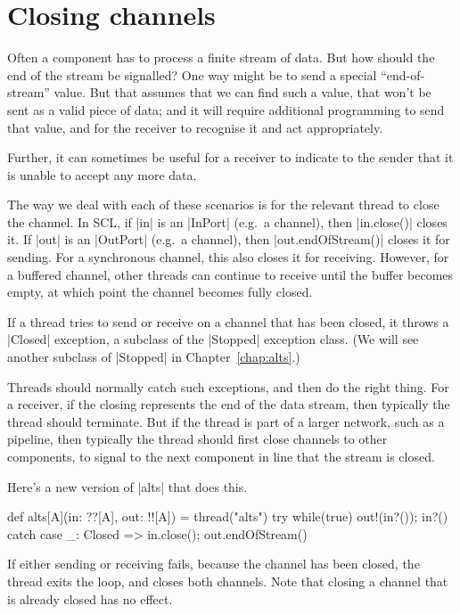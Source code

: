 \section{Closing channels}

Often a component has to process a finite stream of data.  But how should the
end of the stream be signalled?  One way might be to send a special
``end-of-stream'' value.  But that assumes that we can find such a value, that
won't be sent as a valid piece of data; and it will require additional
programming to send that value, and for the receiver to recognise it and act
appropriately. 

Further, it can sometimes be useful for a receiver to indicate to the sender
that it is unable to accept any more data.

The way we deal with each of these scenarios is for the relevant thread to
close the channel. 
%
In SCL, if |in| is an |InPort| (e.g.~a channel), then |in.close()| closes it.
%
If |out| is an |OutPort| (e.g.~a channel), then |out.endOfStream()| closes it
for sending.  For a synchronous channel, this also closes it for receiving.
However, for a buffered channel, other threads can continue to receive until
the buffer becomes empty, at which point the channel becomes fully closed.


If a thread tries to send or receive on a channel that has been closed, it
throws a |Closed| exception, a subclass of the |Stopped| exception class.
(We will see another subclass of |Stopped| in Chapter~\ref{chap:alts}.)

Threads should normally catch such exceptions, and then do the right thing.
For a receiver, if the closing represents the end of the data stream, then
typically the thread should terminate.  But if the thread is part of a larger
network, such as a pipeline, then typically the thread should first close
channels to other components, to signal to the next component in line that the
stream is closed.


Here's a new version of |alts| that does this.
%
\begin{scala}
def alts[A](in: ??[A], out: !![A]) = thread("alts"){ 
  try{ while(true){ out!(in?()); in?() } } 
  catch{ case _: Closed => in.close(); out.endOfStream() }
}
\end{scala}
% 
If either sending or receiving fails, because the channel has been closed, the
thread exits the loop, and closes both channels.  Note that closing a channel
that is already closed has no effect.

